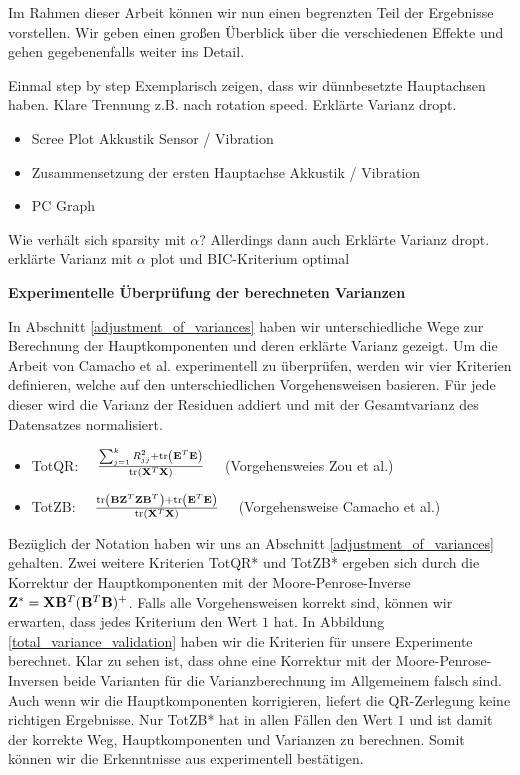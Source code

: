 Im Rahmen dieser Arbeit können wir nun einen begrenzten Teil der Ergebnisse vorstellen. Wir geben einen großen Überblick über die verschiedenen Effekte und gehen gegebenenfalls weiter ins Detail.

Einmal step by step
Exemplarisch zeigen, dass wir dünnbesetzte Hauptachsen haben. Klare Trennung z.B. nach rotation speed. Erklärte Varianz dropt.

\begin{itemize}
\item Scree Plot Akkustik Sensor / Vibration
\item Zusammensetzung der ersten Hauptachse Akkustik / Vibration
\item PC Graph 
\end{itemize}

Wie verhält sich sparsity mit $\alpha$?
Allerdings dann auch Erklärte Varianz dropt.
erklärte Varianz mit $\alpha$ plot und BIC-Kriterium optimal

\textbf{Experimentelle Überprüfung der berechneten Varianzen}

In Abschnitt \ref{adjustment_of_variances} haben wir unterschiedliche Wege zur Berechnung der Hauptkomponenten und deren erklärte Varianz gezeigt. Um die Arbeit von Camacho et al. \cite{camacho} experimentell zu überprüfen, werden wir vier Kriterien definieren, welche auf den unterschiedlichen Vorgehensweisen basieren. Für jede dieser wird die Varianz der Residuen addiert und mit der Gesamtvarianz des Datensatzes normalisiert.
\begin{itemize}
\item TotQR: $\quad \frac{\sum_{j=1}^k R_{jj}^2 + \text{tr} \left( \mathbf{E}^T\mathbf{E} \right)}{\text{tr} \left( \mathbf{X}^T\mathbf{X} \right)} \quad$ (Vorgehensweies Zou et al.)
\item TotZB: $\quad \frac{\text{tr} \left( \mathbf{B} \mathbf{Z}^T \mathbf{Z} \mathbf{B}^T \right) + \text{tr} \left( \mathbf{E}^T\mathbf{E} \right)}{\text{tr} \left( \mathbf{X}^T\mathbf{X} \right)} \quad$ (Vorgehensweise Camacho et al.)
\end{itemize}
Bezüglich der Notation haben wir uns an Abschnitt \ref{adjustment_of_variances} gehalten. Zwei weitere Kriterien TotQR* und TotZB* ergeben sich durch die Korrektur der Hauptkomponenten mit der Moore-Penrose-Inverse $\mathbf{Z}^* = \mathbf{X} \mathbf{B}^T (\mathbf{B}^T\mathbf{B})^+$. Falls alle Vorgehensweisen korrekt sind, können wir erwarten, dass jedes Kriterium den Wert $1$ hat. In Abbildung \ref{total_variance_validation} haben wir die Kriterien für unsere Experimente berechnet. Klar zu sehen ist, dass ohne eine Korrektur mit der Moore-Penrose-Inversen beide Varianten für die Varianzberechnung im Allgemeinem falsch sind. Auch wenn wir die Hauptkomponenten korrigieren, liefert die QR-Zerlegung keine richtigen Ergebnisse. Nur TotZB* hat in allen Fällen den Wert $1$ und ist damit der korrekte Weg, Hauptkomponenten und Varianzen zu berechnen. Somit können wir die Erkenntnisse aus \cite{camacho} experimentell bestätigen.

